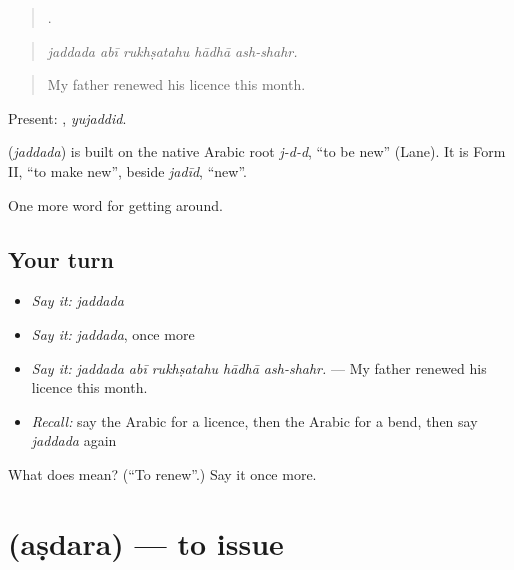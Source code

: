 \begin{quote}
    .
\end{quote}

\begin{quote}
\emph{jaddada abī rukhṣatahu hādhā ash-shahr.}
\end{quote}

\begin{quote}
My father renewed his licence this month.
\end{quote}

Present: , \emph{yujaddid}.

\begin{cousinweb}
\textbf{} (\emph{jaddada}) is built on the native Arabic root \emph{j-d-d}, \textquotedblleft{}to be new\textquotedblright{} (Lane). It is Form II, \textquotedblleft{}to make new\textquotedblright{}, beside \emph{jadīd}, \textquotedblleft{}new\textquotedblright{}.
\end{cousinweb}

\begin{grammarlens}[title={What you've built}]
One more word for getting around.
\end{grammarlens}

\subsection*{Your turn}
\begin{itemize}
\raggedright
  \item \emph{Say it:} \emph{jaddada}
  \item \emph{Say it:} \emph{jaddada}, once more
  \item \emph{Say it:} \emph{jaddada abī rukhṣatahu hādhā ash-shahr.} — My father renewed his licence this month.
  \item \emph{Recall:} say the Arabic for a licence, then the Arabic for a bend, then say \emph{jaddada} again
\end{itemize}

\begin{tcolorbox}[breakable,colback=teal!4,colframe=teal!35!black,title={Before you move on}]
What does  mean? (\textquotedblleft{}To renew\textquotedblright{}.) Say it once more.
\end{tcolorbox}
\section[\texorpdfstring{\ar{أصدر} (aṣdara)}{أصدر (aṣdara)}]{ (aṣdara) — to issue}

